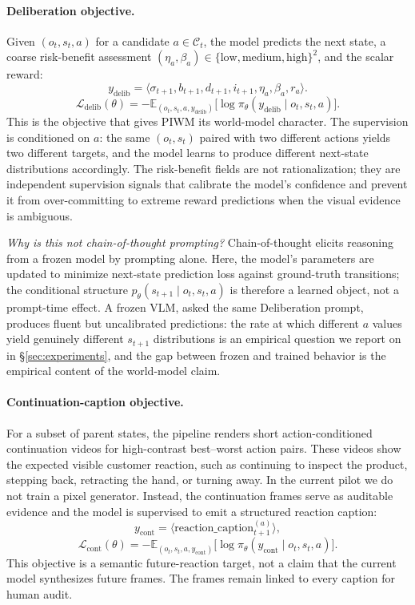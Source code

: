 \documentclass{article}
\begin{document}
\paragraph{Deliberation objective.}
Given $(o_t, s_t, a)$ for a candidate $a \in \mathcal{C}_t$, the model predicts the next state, a coarse risk-benefit assessment $(\eta_a, \beta_a) \in \{\text{low}, \text{medium}, \text{high}\}^2$, and the scalar reward:
\[
y_\text{delib} = \langle \sigma_{t+1}, b_{t+1}, d_{t+1}, i_{t+1}, \eta_a, \beta_a, r_a \rangle.
\]
\[
\mathcal{L}_\text{delib}(\theta) = -\mathbb{E}_{(o_t, s_t, a, y_\text{delib})} \big[ \log \pi_\theta(y_\text{delib} \mid o_t, s_t, a) \big].
\]
This is the objective that gives PIWM its world-model character. The supervision is conditioned on $a$: the same $(o_t, s_t)$ paired with two different actions yields two different targets, and the model learns to produce different next-state distributions accordingly. The risk-benefit fields are not rationalization; they are independent supervision signals that calibrate the model's confidence and prevent it from over-committing to extreme reward predictions when the visual evidence is ambiguous.

\textit{Why is this not chain-of-thought prompting?} Chain-of-thought elicits reasoning from a frozen model by prompting alone. Here, the model's parameters are updated to minimize next-state prediction loss against ground-truth transitions; the conditional structure $p_\theta(s_{t+1} \mid o_t, s_t, a)$ is therefore a learned object, not a prompt-time effect. A frozen VLM, asked the same Deliberation prompt, produces fluent but uncalibrated predictions: the rate at which different $a$ values yield genuinely different $s_{t+1}$ distributions is an empirical question we report on in §\ref{sec:experiments}, and the gap between frozen and trained behavior is the empirical content of the world-model claim.

\paragraph{Continuation-caption objective.}
For a subset of parent states, the pipeline renders short action-conditioned continuation videos for high-contrast best--worst action pairs. These videos show the expected visible customer reaction, such as continuing to inspect the product, stepping back, retracting the hand, or turning away. In the current pilot we do not train a pixel generator. Instead, the continuation frames serve as auditable evidence and the model is supervised to emit a structured reaction caption:
\[
y_\text{cont} = \langle \text{reaction\_caption}_{t+1}^{(a)} \rangle,
\]
\[
\mathcal{L}_\text{cont}(\theta) =
-\mathbb{E}_{(o_t, s_t, a, y_\text{cont})}
\big[\log \pi_\theta(y_\text{cont} \mid o_t, s_t, a)\big].
\]
This objective is a semantic future-reaction target, not a claim that the current model synthesizes future frames. The frames remain linked to every caption for human audit.
\end{document}
